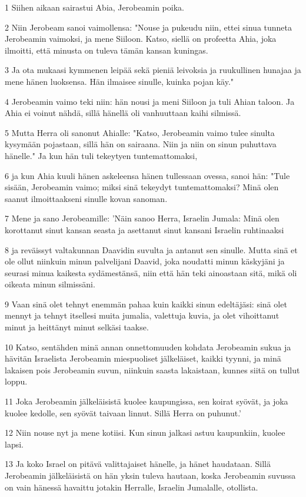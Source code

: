 \par 1 Siihen aikaan sairastui Abia, Jerobeamin poika.
\par 2 Niin Jerobeam sanoi vaimollensa: "Nouse ja pukeudu niin, ettei sinua tunneta Jerobeamin vaimoksi, ja mene Siiloon. Katso, siellä on profeetta Ahia, joka ilmoitti, että minusta on tuleva tämän kansan kuningas.
\par 3 Ja ota mukaasi kymmenen leipää sekä pieniä leivoksia ja ruukullinen hunajaa ja mene hänen luoksensa. Hän ilmaisee sinulle, kuinka pojan käy."
\par 4 Jerobeamin vaimo teki niin: hän nousi ja meni Siiloon ja tuli Ahian taloon. Ja Ahia ei voinut nähdä, sillä hänellä oli vanhuuttaan kaihi silmissä.
\par 5 Mutta Herra oli sanonut Ahialle: "Katso, Jerobeamin vaimo tulee sinulta kysymään pojastaan, sillä hän on sairaana. Niin ja niin on sinun puhuttava hänelle." Ja kun hän tuli tekeytyen tuntemattomaksi,
\par 6 ja kun Ahia kuuli hänen askeleensa hänen tullessaan ovessa, sanoi hän: "Tule sisään, Jerobeamin vaimo; miksi sinä tekeydyt tuntemattomaksi? Minä olen saanut ilmoittaakseni sinulle kovan sanoman.
\par 7 Mene ja sano Jerobeamille: 'Näin sanoo Herra, Israelin Jumala: Minä olen korottanut sinut kansan seasta ja asettanut sinut kansani Israelin ruhtinaaksi
\par 8 ja reväissyt valtakunnan Daavidin suvulta ja antanut sen sinulle. Mutta sinä et ole ollut niinkuin minun palvelijani Daavid, joka noudatti minun käskyjäni ja seurasi minua kaikesta sydämestänsä, niin että hän teki ainoastaan sitä, mikä oli oikeata minun silmissäni.
\par 9 Vaan sinä olet tehnyt enemmän pahaa kuin kaikki sinun edeltäjäsi: sinä olet mennyt ja tehnyt itsellesi muita jumalia, valettuja kuvia, ja olet vihoittanut minut ja heittänyt minut selkäsi taakse.
\par 10 Katso, sentähden minä annan onnettomuuden kohdata Jerobeamin sukua ja hävitän Israelista Jerobeamin miespuoliset jälkeläiset, kaikki tyynni, ja minä lakaisen pois Jerobeamin suvun, niinkuin saasta lakaistaan, kunnes siitä on tullut loppu.
\par 11 Joka Jerobeamin jälkeläisistä kuolee kaupungissa, sen koirat syövät, ja joka kuolee kedolle, sen syövät taivaan linnut. Sillä Herra on puhunut.'
\par 12 Niin nouse nyt ja mene kotiisi. Kun sinun jalkasi astuu kaupunkiin, kuolee lapsi.
\par 13 Ja koko Israel on pitävä valittajaiset hänelle, ja hänet haudataan. Sillä Jerobeamin jälkeläisistä on hän yksin tuleva hautaan, koska Jerobeamin suvussa on vain hänessä havaittu jotakin Herralle, Israelin Jumalalle, otollista.
